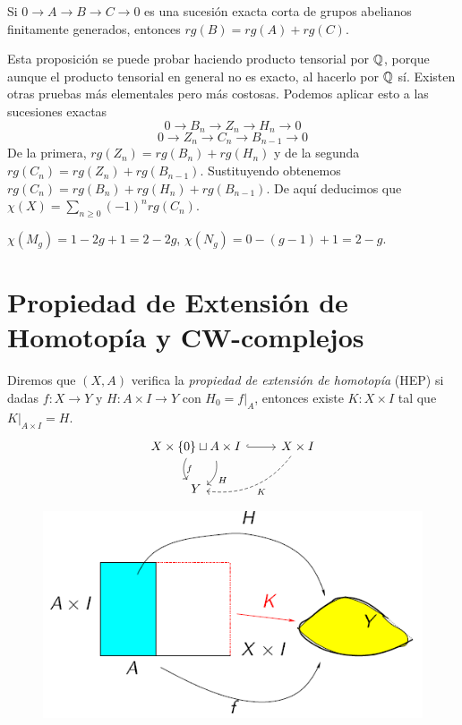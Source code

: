 \documentclass[TA.tex]{subfiles}
\begin{document}
\begin{prop}
Si $0\to A\to B\to C\to 0$ es una sucesión exacta corta de grupos abelianos finitamente generados, entonces $rg(B)=rg(A)+rg(C)$.
\end{prop}
Esta proposición se puede probar haciendo producto tensorial por $\mathbb{Q}$, porque aunque el producto tensorial en general no es exacto, al hacerlo por $\mathbb{Q}$ sí. Existen otras pruebas más elementales pero más costosas. Podemos aplicar esto a las sucesiones exactas
\[
0\to B_n\to Z_n\to H_n\to 0
\]
\[
0\to Z_n\to C_n\to B_{n-1}\to 0
\]
De la primera, $rg(Z_n)=rg(B_n)+rg(H_n)$ y de la segunda $rg(C_n)=rg(Z_n)+rg(B_{n-1})$. Sustituyendo obtenemos $rg(C_n)=rg(B_n)+rg(H_n)+rg(B_{n-1})$. De aquí deducimos que $\chi(X)=\sum_{n\geq 0}(-1)^nrg(C_n)$. 

\begin{ej}
$\chi(M_g)=1-2g+1=2-2g$, $\chi(N_g)=0-(g-1)+1=2-g$. 
\end{ej}

\section{Propiedad de Extensión de Homotopía y CW-complejos}


\begin{defi}
Diremos que $(X,A)$ verifica la \emph{propiedad de extensión de homotopía} (HEP) si dadas $f:X\to Y$ y $H:A\times I\to Y$ con $H_0=f|_{A}$, entonces existe $K:X\times I$ tal que $K|_{A\times I}=H$.
\[
\begin{tikzcd}
X\times\{0\}\sqcup A\times I\arrow[r, hookrightarrow]\arrow[d, bend left, shift left=5, end anchor={[xshift=-7]}, start anchor={[yshift=2]},  "H"]\arrow[d, bend right, shift right,"f"] & X\times I\arrow[dl, bend left, dashed, "K"]\\
Y &
\end{tikzcd}
\]

\begin{figure}[h!]
\includegraphics[scale=0.6]{HEP}
\end{figure}
\end{defi}
\end{document}
